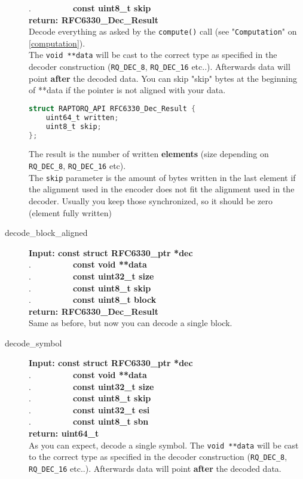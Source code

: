 \documentclass[11pt,a4paper]{refart}
\begin{document}
\begin{description}
.\ \ \ \ \ \ \ \ \ \ \textbf{const uint8\_t skip}\\
\textbf{return: RFC6330\_Dec\_Result}\\
Decode everything as asked by the \texttt{compute()} call (see "\texttt{Computation}" on \ref{computation}).\\
The \texttt{void **data} will be cast to the correct type as specified in the decoder construction (\texttt{RQ\_DEC\_8}, \texttt{RQ\_DEC\_16} etc..). Afterwards data will point \textbf{after} the decoded data. You can skip "skip" bytes at the beginning of **data if the pointer
is not aligned with your data.
\begin{lstlisting}[language=C]
struct RAPTORQ_API RFC6330_Dec_Result {
	uint64_t written;
	uint8_t skip;
};
\end{lstlisting}
The result is the number of written \textbf{elements} (size depending on \texttt{RQ\_DEC\_8}, \texttt{RQ\_DEC\_16} etc).\\
The \texttt{skip} parameter is the amount of bytes written in the last element if the alignment used in the encoder does not fit the
alignment used in the decoder. Usually you keep those synchronized, so it should be zero (element fully written)
\item[decode\_block\_aligned]\textbf{Input: const struct RFC6330\_ptr *dec}\\
.\ \ \ \ \ \ \ \ \ \ \textbf{const void **data}\\
.\ \ \ \ \ \ \ \ \ \ \textbf{const uint32\_t size}\\
.\ \ \ \ \ \ \ \ \ \ \textbf{const uint8\_t skip}\\
.\ \ \ \ \ \ \ \ \ \ \textbf{const uint8\_t block}\\
\textbf{return: RFC6330\_Dec\_Result}\\
Same as before, but now you can decode a single block.
\newpage
\item[decode\_symbol]\textbf{Input: const struct RFC6330\_ptr *dec}\\
.\ \ \ \ \ \ \ \ \ \ \textbf{const void **data}\\
.\ \ \ \ \ \ \ \ \ \ \textbf{const uint32\_t size}\\
.\ \ \ \ \ \ \ \ \ \ \textbf{const uint8\_t skip}\\
.\ \ \ \ \ \ \ \ \ \ \textbf{const uint32\_t esi}\\
.\ \ \ \ \ \ \ \ \ \ \textbf{const uint8\_t sbn}\\
\textbf{return: uint64\_t}\\
As you can expect, decode a single symbol. The \texttt{void **data} will be cast to the correct type as specified in the decoder construction (\texttt{RQ\_DEC\_8}, \texttt{RQ\_DEC\_16} etc..). Afterwards data will point \textbf{after} the decoded data.\\

\end{description}
\end{document}
